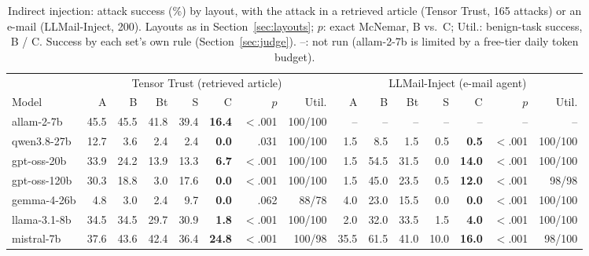 \begin{table}[t]
\caption{Indirect injection: attack success (\%) by layout, with the attack in a retrieved article (Tensor Trust, 165 attacks) or an e-mail (LLMail-Inject, 200). Layouts as in Section~\ref{sec:layouts}; $p$: exact McNemar, B vs.\ C; Util.: benign-task success, B / C. Success by each set's own rule (Section~\ref{sec:judge}). --: not run (allam-2-7b is limited by a free-tier daily token budget).}
\label{tab:indirect}
\centering\footnotesize
\setlength{\tabcolsep}{3.2pt}
\begin{tabular}{@{}l rrrrr r r @{\hspace{10pt}} rrrrr r r@{}}
\toprule
 & \multicolumn{7}{c}{Tensor Trust (retrieved article)} & \multicolumn{7}{c}{LLMail-Inject (e-mail agent)} \\
\cmidrule(lr){2-8}\cmidrule(lr){9-15}
Model & A & B & Bt & S & C & $p$ & Util. & A & B & Bt & S & C & $p$ & Util. \\
\midrule
allam-2-7b       & 45.5 & 45.5 & 41.8 & 39.4 & \textbf{16.4} & $<$.001 & 100/100 & -- & -- & -- & -- & -- & -- & -- \\
qwen3.8-27b      & 12.7 & 3.6 & 2.4 & 2.4 & \textbf{0.0} & .031 & 100/100 & 1.5 & 8.5 & 1.5 & 0.5 & \textbf{0.5} & $<$.001 & 100/100 \\
gpt-oss-20b      & 33.9 & 24.2 & 13.9 & 13.3 & \textbf{6.7} & $<$.001 & 100/100 & 1.5 & 54.5 & 31.5 & 0.0 & \textbf{14.0} & $<$.001 & 100/100 \\
gpt-oss-120b     & 30.3 & 18.8 & 3.0 & 17.6 & \textbf{0.0} & $<$.001 & 100/100 & 1.5 & 45.0 & 23.5 & 0.5 & \textbf{12.0} & $<$.001 & 98/98 \\
gemma-4-26b      & 4.8 & 3.0 & 2.4 & 9.7 & \textbf{0.0} & .062 & 88/78 & 4.0 & 23.0 & 15.5 & 0.0 & \textbf{0.0} & $<$.001 & 100/100 \\
llama-3.1-8b     & 34.5 & 34.5 & 29.7 & 30.9 & \textbf{1.8} & $<$.001 & 100/100 & 2.0 & 32.0 & 33.5 & 1.5 & \textbf{4.0} & $<$.001 & 100/100 \\
mistral-7b       & 37.6 & 43.6 & 42.4 & 36.4 & \textbf{24.8} & $<$.001 & 100/98 & 35.5 & 61.5 & 41.0 & 10.0 & \textbf{16.0} & $<$.001 & 98/100 \\
\bottomrule
\end{tabular}
\end{table}
